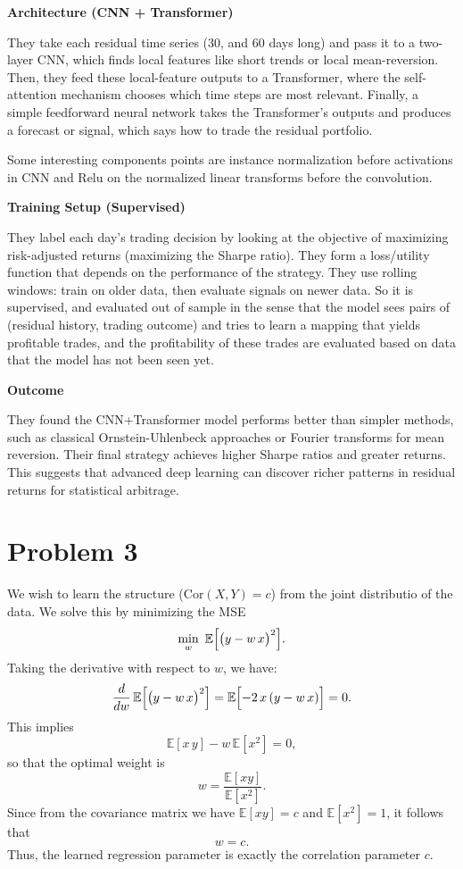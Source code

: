 \documentclass[11pt]{article}
\begin{document}
\vspace{1em}
\textbf{Architecture (CNN + Transformer)}

They take each residual time series (30, and 60 days long) and pass it to 
a two-layer CNN, which finds local features like short trends or 
local mean-reversion. Then, they feed these local-feature outputs to a 
Transformer, where the self-attention mechanism chooses which time steps 
are most relevant. Finally, a simple feedforward neural network takes the 
Transformer’s outputs and produces a forecast or signal, which 
says how to trade the residual portfolio.

Some interesting components points are instance normalization before activations in CNN and Relu on the normalized 
linear transforms before the convolution. 

\vspace{1em}
\textbf{Training Setup (Supervised)}

They label each day’s trading decision by looking at the objective of maximizing 
risk-adjusted returns (maximizing the Sharpe ratio). They form a loss/utility 
function that depends on the performance of the strategy. 
They use rolling windows: train on older data, then evaluate signals on newer 
data. So it is supervised, and evaluated out of sample in the sense that the model sees pairs of (residual 
history, trading outcome) and tries to learn a mapping that yields profitable 
trades, and the profitability of these trades are evaluated based on data that the model has not been seen yet.

\vspace{1em}
\textbf{Outcome}

They found the CNN+Transformer model performs better than simpler 
methods, such as classical Ornstein-Uhlenbeck approaches or Fourier transforms 
for mean reversion. Their final strategy achieves higher Sharpe ratios and 
greater returns. This suggests that advanced deep learning can discover richer 
patterns in residual returns for statistical arbitrage.








\section*{Problem 3}

We wish to learn the structure ($\text{Cor}(X,Y) = c$) from the joint distributio of the data. 
We solve this by minimizing the MSE
\[
\min_{w} \ \mathbb{E}\Bigl[\bigl(y - w\,x\bigr)^2\Bigr].
\]
Taking the derivative with respect to $w$, we have:
\[
\frac{d}{dw}\, \mathbb{E}\Bigl[\bigl(y - w\,x\bigr)^2\Bigr]
= \mathbb{E}\Bigl[-2\,x\,(y - w\,x)\Bigr] = 0.
\]
This implies
\[
\mathbb{E}[x\,y] - w\,\mathbb{E}[x^2] = 0,
\]
so that the optimal weight is
\[
w = \frac{\mathbb{E}[xy]}{\mathbb{E}[x^2]}.
\]
Since from the covariance matrix we have $\mathbb{E}[xy] = c$ and $\mathbb{E}[x^2] = 1$, it follows that
\[
w = c.
\]
Thus, the learned regression parameter is exactly the correlation parameter $c$.
\end{document}

